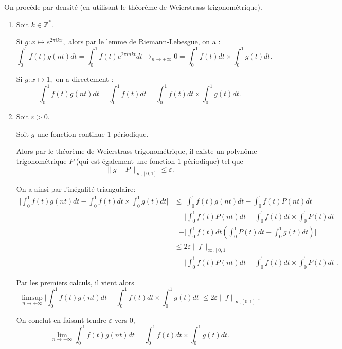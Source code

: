 On procède par densité (en utilisant le théorème de Weierstrass trigonométrique).

\begin{enumerate}
\item Soit $k\in \mathbb{Z}^{*}.$

Si $\displaystyle g :x \mapsto e^{2\pi ikx},$ alors par le lemme de Riemann-Lebesgue, on a : $$\int_{0}^{1}f(t)g(nt)dt=\int_{0}^{1}f(t)e^{2\pi inkt}dt\longrightarrow_{n\rightarrow +\infty} 0=\int_{0}^{1}f(t)dt\times \int_{0}^{1}g(t)dt.$$

Si $\displaystyle g :x \mapsto 1,$ on a directement : $$\int_{0}^{1}f(t)g(nt)dt=\int_{0}^{1}f(t)dt=\int_{0}^{1}f(t)dt\times \int_{0}^{1}g(t)dt.$$

\item Soit $\varepsilon>0.$

Soit $g$ une fonction continue $1$-périodique. 

Alors par le théorème de Weierstrass trigonométrique, il existe un polynôme trigonométrique $P$ (qui est également une fonction $1$-périodique) tel que $$\|g-P\|_{{\infty},[0,1]}\leq \varepsilon.$$

On a ainsi par l'inégalité triangulaire: 
\begin{align*}
\vert \int_{0}^{1}f(t)g(nt)dt-\int_{0}^{1}f(t)dt\times \int_{0}^{1}g(t)dt \vert & \leq \vert \int_{0}^{1}f(t)g(nt)dt-\int_{0}^{1}f(t)P(nt)dt\vert\\
& \mbox{ }+ \vert \int_{0}^{1}f(t)P(nt)dt-\int_{0}^{1}f(t)dt\times \int_{0}^{1}P(t)dt \vert\\
& \mbox{ }+ \vert \int_{0}^{1}f(t)dt\left(\int_{0}^{1}P(t)dt-\int_{0}^{1}g(t)dt\right)\vert\\
& \leq 2\varepsilon\|f\|_{{\infty},[0,1]}\\
& \mbox{ }+ \vert \int_{0}^{1}f(t)P(nt)dt-\int_{0}^{1}f(t)dt\times \int_{0}^{1}P(t)dt \vert.
\end{align*}

Par les premiers calculs, il vient alors $$\limsup_{n\rightarrow +\infty}\vert \int_{0}^{1}f(t)g(nt)dt-\int_{0}^{1}f(t)dt\times \int_{0}^{1}g(t)dt \vert \leq 2\varepsilon\|f\|_{{\infty},[0,1]}.$$

On conclut en faisant tendre $\varepsilon$ vers $0,$ $$\lim_{n\rightarrow +\infty}\int_{0}^{1}f(t)g(nt)dt=\int_{0}^{1}f(t)dt\times \int_{0}^{1}g(t)dt.$$ 

\end{enumerate}


